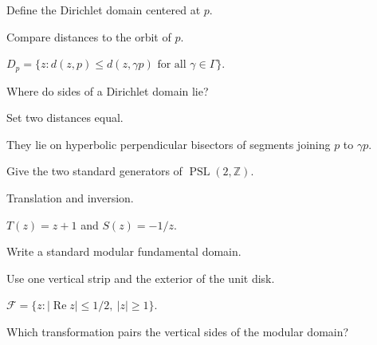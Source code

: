 \begin{exercise}\label{exr:vii35-09}
Define the Dirichlet domain centered at \(p\).
\end{exercise}

\begin{hint}
Compare distances to the orbit of \(p\).
\end{hint}

\begin{solution}
\(D_p=\{z:d(z,p)\le d(z,\gamma p)\text{ for all }\gamma\in\Gamma\}\).
\end{solution}

\begin{exercise}\label{exr:vii35-10}
Where do sides of a Dirichlet domain lie?
\end{exercise}

\begin{hint}
Set two distances equal.
\end{hint}

\begin{solution}
They lie on hyperbolic perpendicular bisectors of segments joining \(p\) to \(\gamma p\).
\end{solution}

\begin{exercise}\label{exr:vii35-11}
Give the two standard generators of \(\operatorname{PSL}(2,\mathbb Z)\).
\end{exercise}

\begin{hint}
Translation and inversion.
\end{hint}

\begin{solution}
\(T(z)=z+1\) and \(S(z)=-1/z\).
\end{solution}

\begin{exercise}\label{exr:vii35-12}
Write a standard modular fundamental domain.
\end{exercise}

\begin{hint}
Use one vertical strip and the exterior of the unit disk.
\end{hint}

\begin{solution}
\(\mathcal F=\{z:|\operatorname{Re}z|\le1/2,\ |z|\ge1\}\).
\end{solution}

\begin{exercise}\label{exr:vii35-13}
Which transformation pairs the vertical sides of the modular domain?
\end{exercise}

